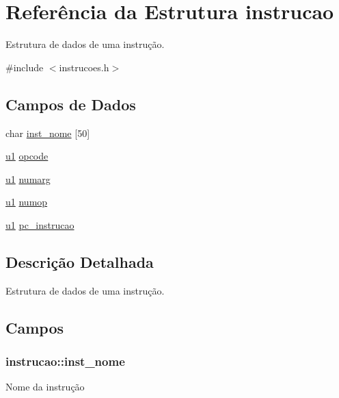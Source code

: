 \hypertarget{structinstrucao}{}\section{Referência da Estrutura instrucao}
\label{structinstrucao}


Estrutura de dados de uma instrução.  




{\ttfamily \#include $<$instrucoes.\+h$>$}

\subsection*{Campos de Dados}
\begin{DoxyCompactItemize}
\item 
char \hyperlink{structinstrucao_ac2c793a7850383fa1cb4cf040d3c3cb4}{inst\+\_\+nome} \mbox{[}50\mbox{]}
\item 
\hyperlink{lista__operandos_8h_ad9f4cdb6757615aae2fad89dab3c5470}{u1} \hyperlink{structinstrucao_a588fa0d2c21e3de3d31382cdd08a3f6c}{opcode}
\item 
\hyperlink{lista__operandos_8h_ad9f4cdb6757615aae2fad89dab3c5470}{u1} \hyperlink{structinstrucao_abe29e9abb3acf6ab4f1b4690d31b456d}{numarg}
\item 
\hyperlink{lista__operandos_8h_ad9f4cdb6757615aae2fad89dab3c5470}{u1} \hyperlink{structinstrucao_ada3363067b90142344358001d51dd197}{numop}
\item 
\hyperlink{lista__operandos_8h_ad9f4cdb6757615aae2fad89dab3c5470}{u1} \hyperlink{structinstrucao_adf700f8998ffadaabba2ebf5aa4f6e21}{pc\+\_\+instrucao}
\end{DoxyCompactItemize}


\subsection{Descrição Detalhada}
Estrutura de dados de uma instrução. 

\subsection{Campos}
\subsubsection[{\texorpdfstring{inst\+\_\+nome}{inst_nome}}]{\setlength{\rightskip}{0pt plus 5cm}instrucao\+::inst\+\_\+nome}\hypertarget{structinstrucao_ac2c793a7850383fa1cb4cf040d3c3cb4}{}\label{structinstrucao_ac2c793a7850383fa1cb4cf040d3c3cb4}
Nome da instrução 
